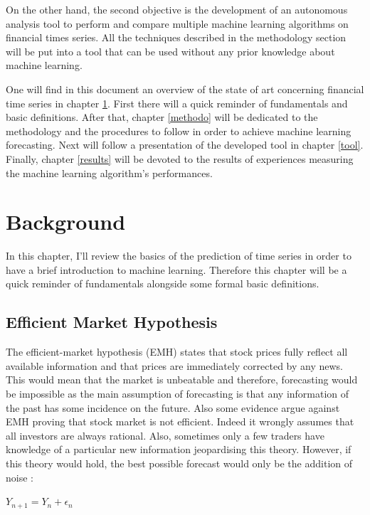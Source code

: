 \documentclass[11pt,a4paper,oneside]{book}
\begin{document}
On the other hand, the second objective is the development of an autonomous analysis tool to perform and compare multiple machine learning algorithms on financial times series. All the techniques described in the methodology section will be put into a tool that can be used without any prior knowledge about machine learning.

One will find in this document an overview of the state of art concerning financial time series in chapter \ref{backgr}. First there will a quick reminder of fundamentals and basic definitions. After that, chapter \ref{methodo} will be dedicated to the methodology and the procedures to follow in order to achieve machine learning forecasting. Next will follow a presentation of the developed tool in chapter \ref{tool}. Finally, chapter \ref{results} will be devoted to the results of experiences measuring the machine learning algorithm's performances.




\chapter{Background} \label{backgr}

In this chapter, I'll review the basics of the prediction of time series in order to have a brief introduction to machine learning. Therefore this chapter will be a quick reminder of fundamentals alongside some formal basic definitions. 



\section{Efficient Market Hypothesis}

The efficient-market hypothesis (EMH) states that stock prices fully reflect all available information and that prices are immediately corrected by any news. This would mean that the market is unbeatable and therefore, forecasting would be impossible as the main assumption of forecasting is that any information of the past has some incidence on the future. Also some evidence argue against EMH proving that stock market is not efficient. Indeed it wrongly assumes that all investors are always rational. Also, sometimes only a few traders have knowledge of a particular new information jeopardising this theory. However, if this theory would hold, the best possible forecast would only be the addition of noise \cite{aamodt} : 

\begin{center}
    $Y_{n+1} = Y_{n} + \epsilon_{n}$
\end{center}
\end{document}
